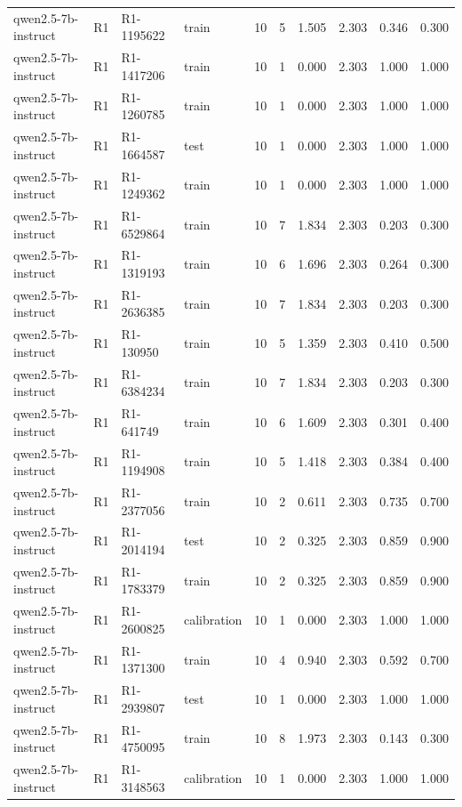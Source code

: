 \begin{table}
\begin{tabular}{llllrrrrrr}
qwen2.5-7b-instruct & R1 & R1-1195622 & train & 10 & 5 & 1.505 & 2.303 & 0.346 & 0.300 \\
qwen2.5-7b-instruct & R1 & R1-1417206 & train & 10 & 1 & 0.000 & 2.303 & 1.000 & 1.000 \\
qwen2.5-7b-instruct & R1 & R1-1260785 & train & 10 & 1 & 0.000 & 2.303 & 1.000 & 1.000 \\
qwen2.5-7b-instruct & R1 & R1-1664587 & test & 10 & 1 & 0.000 & 2.303 & 1.000 & 1.000 \\
qwen2.5-7b-instruct & R1 & R1-1249362 & train & 10 & 1 & 0.000 & 2.303 & 1.000 & 1.000 \\
qwen2.5-7b-instruct & R1 & R1-6529864 & train & 10 & 7 & 1.834 & 2.303 & 0.203 & 0.300 \\
qwen2.5-7b-instruct & R1 & R1-1319193 & train & 10 & 6 & 1.696 & 2.303 & 0.264 & 0.300 \\
qwen2.5-7b-instruct & R1 & R1-2636385 & train & 10 & 7 & 1.834 & 2.303 & 0.203 & 0.300 \\
qwen2.5-7b-instruct & R1 & R1-130950 & train & 10 & 5 & 1.359 & 2.303 & 0.410 & 0.500 \\
qwen2.5-7b-instruct & R1 & R1-6384234 & train & 10 & 7 & 1.834 & 2.303 & 0.203 & 0.300 \\
qwen2.5-7b-instruct & R1 & R1-641749 & train & 10 & 6 & 1.609 & 2.303 & 0.301 & 0.400 \\
qwen2.5-7b-instruct & R1 & R1-1194908 & train & 10 & 5 & 1.418 & 2.303 & 0.384 & 0.400 \\
qwen2.5-7b-instruct & R1 & R1-2377056 & train & 10 & 2 & 0.611 & 2.303 & 0.735 & 0.700 \\
qwen2.5-7b-instruct & R1 & R1-2014194 & test & 10 & 2 & 0.325 & 2.303 & 0.859 & 0.900 \\
qwen2.5-7b-instruct & R1 & R1-1783379 & train & 10 & 2 & 0.325 & 2.303 & 0.859 & 0.900 \\
qwen2.5-7b-instruct & R1 & R1-2600825 & calibration & 10 & 1 & 0.000 & 2.303 & 1.000 & 1.000 \\
qwen2.5-7b-instruct & R1 & R1-1371300 & train & 10 & 4 & 0.940 & 2.303 & 0.592 & 0.700 \\
qwen2.5-7b-instruct & R1 & R1-2939807 & test & 10 & 1 & 0.000 & 2.303 & 1.000 & 1.000 \\
qwen2.5-7b-instruct & R1 & R1-4750095 & train & 10 & 8 & 1.973 & 2.303 & 0.143 & 0.300 \\
qwen2.5-7b-instruct & R1 & R1-3148563 & calibration & 10 & 1 & 0.000 & 2.303 & 1.000 & 1.000 \\

\end{tabular}
\end{table}
